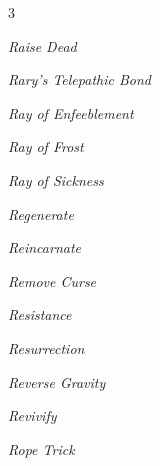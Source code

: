 \documentclass[10pt,a4paper,twoside,bg=print,twocolumn,openany,nodeprecatedcode]{dndbook}
\begin{document}
\begin{description}
\begin{multicols}{3}
\item \textit{Raise Dead}
\item \textit{Rary's Telepathic Bond}
\item \textit{Ray of Enfeeblement}
\item \textit{Ray of Frost}
\item \textit{Ray of Sickness}
\item \textit{Regenerate}
\item \textit{Reincarnate}
\item \textit{Remove Curse}
\item \textit{Resistance}
\item \textit{Resurrection}
\item \textit{Reverse Gravity}
\item \textit{Revivify}
\item \textit{Rope Trick}
\end{multicols}

\end{description}
\end{document}
